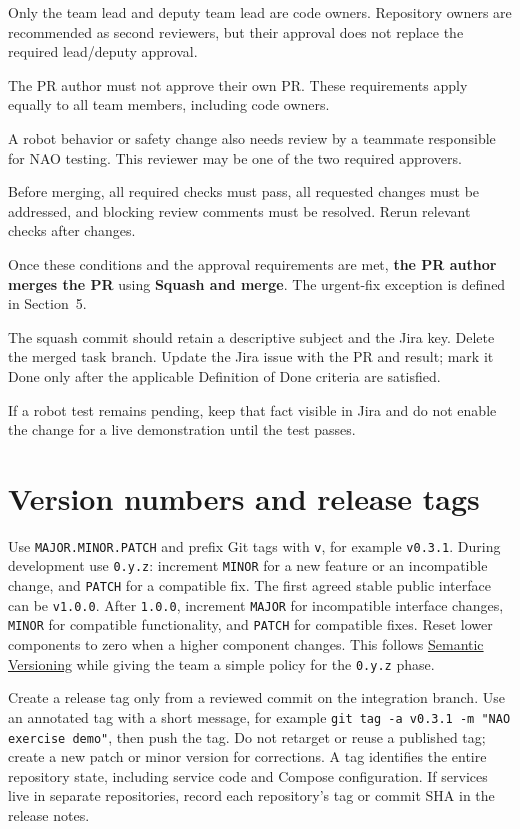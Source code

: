 \documentclass[12pt,a4paper]{article}
\begin{document}
Only the team lead and deputy team lead are code owners.
Repository owners are recommended as second reviewers, but their
approval does not replace the required lead/deputy approval.

The PR author must not approve their own PR. These requirements apply equally to all team members, including code owners.

A robot behavior or safety change also needs review by a teammate responsible for NAO testing. This reviewer may be one of the two required approvers.

Before merging, all required checks must pass, all requested changes must be addressed, and blocking review comments must be resolved. Rerun relevant checks after changes.

Once these conditions and the approval requirements are met, \textbf{the PR author merges the PR} using \textbf{Squash and merge}. The urgent-fix exception is defined in Section~5.

The squash commit should retain a descriptive subject and the Jira key. Delete the merged task branch. Update the Jira issue with the PR and result; mark it Done only after the applicable Definition of Done criteria are satisfied.

If a robot test remains pending, keep that fact visible in Jira and do not enable the change for a live demonstration until the test passes.

\section{Version numbers and release tags}

Use \texttt{MAJOR.MINOR.PATCH} and prefix Git tags with \texttt{v}, for example \texttt{v0.3.1}. During development use \texttt{0.y.z}: increment \texttt{MINOR} for a new feature or an incompatible change, and \texttt{PATCH} for a compatible fix. The first agreed stable public interface can be \texttt{v1.0.0}. After \texttt{1.0.0}, increment \texttt{MAJOR} for incompatible interface changes, \texttt{MINOR} for compatible functionality, and \texttt{PATCH} for compatible fixes. Reset lower components to zero when a higher component changes. This follows \href{https://semver.org/}{Semantic Versioning} while giving the team a simple policy for the \texttt{0.y.z} phase.

Create a release tag only from a reviewed commit on the integration branch. Use an annotated tag with a short message, for example \texttt{git tag -a v0.3.1 -m "NAO exercise demo"}, then push the tag. Do not retarget or reuse a published tag; create a new patch or minor version for corrections. A tag identifies the entire repository state, including service code and Compose configuration. If services live in separate repositories, record each repository's tag or commit SHA in the release notes.
\end{document}
